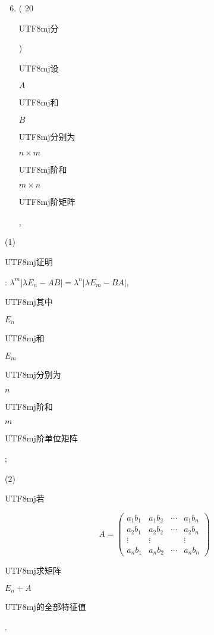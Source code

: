 \documentclass[10pt]{article}
\begin{document}
\begin{enumerate}
  \setcounter{enumi}{5}
  \item ( 20 \begin{CJK}{UTF8}{mj}分\end{CJK}) \begin{CJK}{UTF8}{mj}设\end{CJK} $A$ \begin{CJK}{UTF8}{mj}和\end{CJK} $B$ \begin{CJK}{UTF8}{mj}分别为\end{CJK} $n \times m$ \begin{CJK}{UTF8}{mj}阶和\end{CJK} $m \times n$ \begin{CJK}{UTF8}{mj}阶矩阵\end{CJK},
\end{enumerate}
(1) \begin{CJK}{UTF8}{mj}证明\end{CJK}: $\lambda^{m}\left|\lambda E_{n}-A B\right|=\lambda^{n}\left|\lambda E_{m}-B A\right|$, \begin{CJK}{UTF8}{mj}其中\end{CJK} $E_{n}$ \begin{CJK}{UTF8}{mj}和\end{CJK} $E_{m}$ \begin{CJK}{UTF8}{mj}分别为\end{CJK} $n$ \begin{CJK}{UTF8}{mj}阶和\end{CJK} $m$ \begin{CJK}{UTF8}{mj}阶单位矩阵\end{CJK};

(2) \begin{CJK}{UTF8}{mj}若\end{CJK}
$$
A=\left(\begin{array}{cccc}
a_{1} b_{1} & a_{1} b_{2} & \cdots & a_{1} b_{n} \\
a_{2} b_{1} & a_{2} b_{2} & \cdots & a_{2} b_{n} \\
\vdots & \vdots & & \vdots \\
a_{n} b_{1} & a_{n} b_{2} & \cdots & a_{n} b_{n}
\end{array}\right)
$$
\begin{CJK}{UTF8}{mj}求矩阵\end{CJK} $E_{n}+A$ \begin{CJK}{UTF8}{mj}的全部特征值\end{CJK}.
\end{document}
